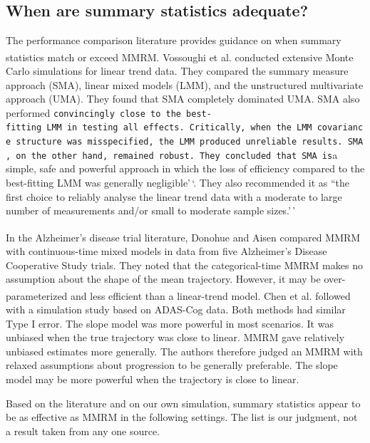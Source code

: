 \documentclass[
  11pt,
]{article}
\begin{document}
\subsection{When are summary statistics adequate?}\label{when-are-summary-statistics-adequate}

The performance comparison literature provides guidance on
when summary statistics match or exceed MMRM.
Vossoughi et al.\textsuperscript{} conducted
extensive Monte Carlo simulations for linear trend data. They compared
the summary measure approach (SMA), linear mixed models (LMM), and the
unstructured multivariate approach (UMA). They found that SMA completely
dominated UMA. SMA also performed \texttt{convincingly\ close\textquotesingle{}\textquotesingle{}\ to\ the\ best-fitting\ LMM\ in\ testing\ all\ effects.\ Critically,\ when\ the\ LMM\ covariance\ structure\ was\ misspecified,\ the\ LMM\ produced\ unreliable\ results.\ SMA,\ on\ the\ other\ hand,\ remained\ robust.\ They\ concluded\ that\ SMA\ is}a simple, safe and powerful approach in which the loss of
efficiency compared to the best-fitting LMM was generally negligible'\,`.
They also recommended it as ``the first choice to reliably analyse the
linear trend data with a moderate to large number of measurements and/or
small to moderate sample sizes.'\,'

In the Alzheimer's disease trial literature,
Donohue and Aisen\textsuperscript{} compared MMRM with
continuous-time mixed models in data from five Alzheimer's Disease
Cooperative Study trials. They noted that the categorical-time MMRM
makes no assumption about the shape of the mean trajectory. However, it
may be over-parameterized and less efficient than a linear-trend model.
Chen et al.\textsuperscript{} followed with a
simulation study based on ADAS-Cog data. Both methods had similar Type I
error. The slope model was more powerful in most scenarios. It was
unbiased when the true trajectory was close to linear. MMRM gave
relatively unbiased estimates more generally. The authors therefore
judged an MMRM with relaxed assumptions about progression to be
generally preferable. The slope model may be more powerful when the
trajectory is close to linear.

Based on the literature and on our own simulation, summary
statistics appear to be as effective as MMRM in the following
settings. The list is our
judgment, not a result taken from any one source.
\end{document}
